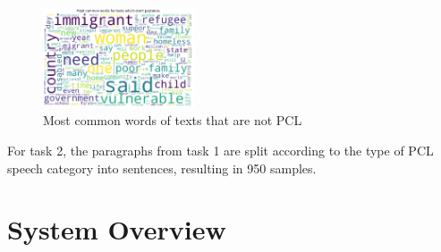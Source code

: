 \documentclass[11pt]{article}
\begin{document}
\begin{figure}[ht]
	\centering
	\includegraphics[width=0.4\textwidth]{nopcl.png}
	\caption{Most common words of texts that are not PCL}
	\label{fig4}
\end{figure}


For task 2, the paragraphs from task 1 are split according to the type of PCL speech category into sentences, resulting in 950 samples.

\section{System Overview}
\end{document}
